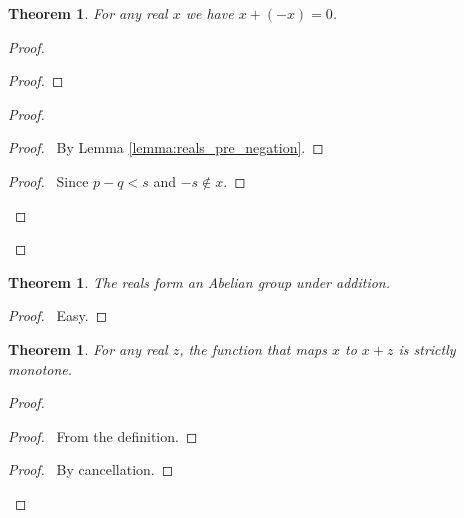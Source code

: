 \documentclass{article}
\let\qed\relax
\newtheorem{theorem}[axiom]{Theorem}
\theoremstyle{definition}
\begin{document}
    \begin{theorem}
        For any real $x$ we have $x + (-x) = 0$.
    \end{theorem}

    \begin{proof}
        \pf
        \begin{proof}
        \end{proof}
        \begin{proof}
            \begin{proof}
                \pf\ By Lemma \ref{lemma:reals_pre_negation}.
            \end{proof}
            \begin{proof}
                \pf\ Since $p-q < s$ and $-s \notin x$.
            \end{proof}
        \end{proof}
        \qed
    \end{proof}

    \begin{theorem}
        The reals form an Abelian group under addition.
    \end{theorem}

    \begin{proof}
        \pf\ Easy. \qed
    \end{proof}

    \begin{theorem}
        For any real $z$, the function that maps $x$ to $x + z$ is strictly monotone.
    \end{theorem}

    \begin{proof}
        \pf
        \begin{proof}
            \pf\ From the definition.
        \end{proof}
        \begin{proof}
            \pf\ By cancellation.
        \end{proof}
        \qed
    \end{proof}
\end{document}
